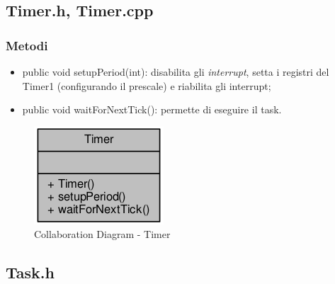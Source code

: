 \subsection{Timer.h, Timer.cpp}
\subsubsection{Metodi}
\begin{itemize}
	\item public void setupPeriod(int): disabilita gli \textit{interrupt}, setta i registri del Timer1 (configurando il prescale) e riabilita gli interrupt;
	\item public void waitForNextTick(): permette di eseguire il task.
\end{itemize}
\begin{figure}[!ht]
	\centering
	\includegraphics[scale=.5]{img/UML/CollaborationDiagram/Timer.png}
	\caption{Collaboration Diagram - Timer}
\end{figure}

\newpage
\subsection{Task.h}
